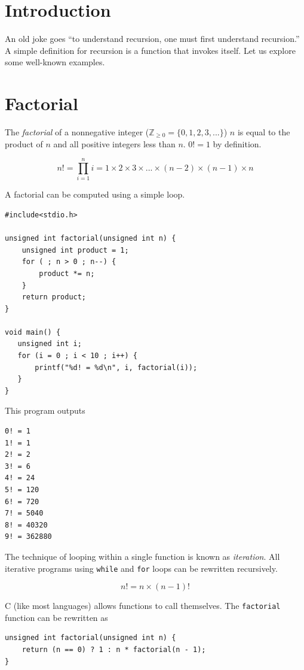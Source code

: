 \documentclass{book}
\begin{document}
\section{Introduction}
An old joke goes ``to understand recursion, one must first understand recursion.'' A simple definition for recursion is a function that invokes itself. Let us explore some well-known examples.

\section{Factorial}

The \textit{factorial} of a nonnegative integer ($\mathbb{Z}_{\ge 0} = \{ 0, 1, 2, 3, ... \}$) $n$ is equal to the product of $n$ and all positive integers less than $n$. $0!=1$ by definition.

\[
n! = \prod_{i=1}^{n} i = 1 \times 2 \times 3 \times ... \times (n-2) \times (n-1) \times n
\]

A factorial can be computed using a simple loop.

\begin{lstlisting}
#include<stdio.h>

unsigned int factorial(unsigned int n) {
    unsigned int product = 1;
    for ( ; n > 0 ; n--) {
        product *= n;
    }
    return product;
}

void main() {
   unsigned int i;
   for (i = 0 ; i < 10 ; i++) {
       printf("%d! = %d\n", i, factorial(i));
   }
}
\end{lstlisting}

This program outputs

\begin{lstlisting}
0! = 1
1! = 1
2! = 2
3! = 6
4! = 24
5! = 120
6! = 720
7! = 5040
8! = 40320
9! = 362880
\end{lstlisting}

The technique of looping within a single function is known as \textit{iteration}. All iterative programs using \texttt{while} and \texttt{for} loops can be rewritten recursively.

\[
n! = n \times (n-1)!
\]

C (like most languages) allows functions to call themselves. The \texttt{factorial} function can be rewritten as

\begin{lstlisting}
unsigned int factorial(unsigned int n) {
    return (n == 0) ? 1 : n * factorial(n - 1);
}
\end{lstlisting}
\end{document}
